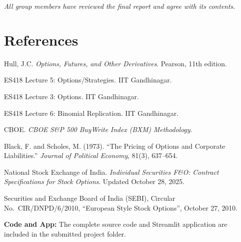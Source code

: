 \documentclass[12pt, a4paper]{article}
\begin{document}
\vspace{1.5em}
\noindent\textit{All group members have reviewed the final report and agree with its contents.}

\section*{References}

\begin{enumerate}[label={[\arabic*]}]
    \item Hull, J.C. \textit{Options, Futures, and Other Derivatives}. Pearson, 11th edition.
    \item ES418 Lecture 5: Options/Strategies. IIT Gandhinagar.
    \item ES418 Lecture 3: Options. IIT Gandhinagar.
    \item ES418 Lecture 6: Binomial Replication. IIT Gandhinagar.
    \item CBOE. \textit{CBOE S\&P 500 BuyWrite Index (BXM) Methodology}.
    \item Black, F. and Scholes, M. (1973). ``The Pricing of Options and Corporate Liabilities.'' \textit{Journal of Political Economy}, 81(3), 637--654.
    \item National Stock Exchange of India. \textit{Individual Securities F\&O: Contract Specifications for Stock Options}. Updated October 28, 2025.
    \item Securities and Exchange Board of India (SEBI), Circular No.\ CIR/DNPD/6/2010, ``European Style Stock Options'', October 27, 2010.
\end{enumerate}

\vspace{1em}
\noindent\textbf{Code and App:} The complete source code and Streamlit application are included in the submitted project folder.
\end{document}
